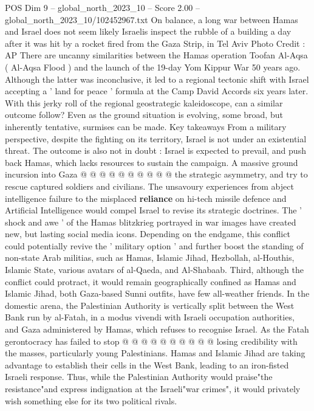 \begin{textsample}{POS Dim 9 – global\_north\_2023\_10 – Score 2.00 – global\_north\_2023\_10/102452967.txt}  \label{ex:f9_pos_406}
On balance, a long war between Hamas and Israel does not seem likely Israelis inspect the rubble of a building a day after it was hit by a rocket fired from the Gaza Strip, in Tel Aviv Photo Credit : AP There are uncanny similarities between the Hamas operation Toofan Al-Aqsa ( Al-Aqsa Flood ) and the launch of the 19-day Yom Kippur War 50 years ago.
Although the latter was inconclusive, it led to a regional tectonic shift with Israel accepting a ' land for peace ' formula at the Camp David Accords six years later.
With this jerky roll of the regional geostrategic kaleidoscope, can a similar outcome follow?
Even as the ground situation is evolving, some broad, but inherently tentative, surmises can be made.
Key takeaways From a military perspective, despite the fighting on its territory, Israel is not under an existential threat.
The outcome is also not in doubt : Israel is expected to prevail, and push back Hamas, which lacks resources to sustain the campaign.
A massive ground incursion into Gaza @ @ @ @ @ @ @ @ @ @ the strategic asymmetry, and try to rescue captured soldiers and civilians.
The unsavoury experiences from abject intelligence failure to the misplaced \textbf{reliance} on hi-tech missile defence and Artificial Intelligence would compel Israel to revise its strategic doctrines.
The ' shock and awe ' of the Hamas blitzkrieg portrayed in war images have created new, but lasting social media icons.
Depending on the endgame, this conflict could potentially revive the ' military option ' and further boost the standing of non-state Arab militias, such as Hamas, Islamic Jihad, Hezbollah, al-Houthis, Islamic State, various avatars of al-Qaeda, and Al-Shabaab.
Third, although the conflict could protract, it would remain geographically confined as Hamas and Islamic Jihad, both Gaza-based Sunni outfits, have few all-weather friends.
In the domestic arena, the Palestinian Authority is vertically split between the West Bank run by al-Fatah, in a modus vivendi with Israeli occupation authorities, and Gaza administered by Hamas, which refuses to recognise Israel.
As the Fatah gerontocracy has failed to stop @ @ @ @ @ @ @ @ @ @ losing credibility with the masses, particularly young Palestinians.
Hamas and Islamic Jihad are taking advantage to establish their cells in the West Bank, leading to an iron-fisted Israeli response.
Thus, while the Palestinian Authority would praise"the resistance"and express indignation at the Israeli"war crimes", it would privately wish something else for its two political rivals.

\end{textsample}
